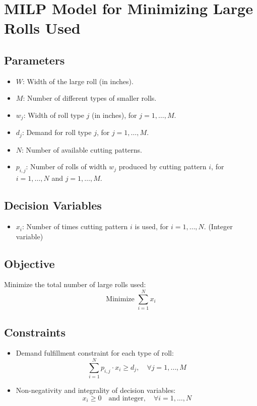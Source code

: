 \documentclass{article}
\begin{document}
\section*{MILP Model for Minimizing Large Rolls Used}

\subsection*{Parameters}
\begin{itemize}
    \item $W$: Width of the large roll (in inches).
    \item $M$: Number of different types of smaller rolls.
    \item $w_j$: Width of roll type $j$ (in inches), for $j = 1, \ldots, M$.
    \item $d_j$: Demand for roll type $j$, for $j = 1, \ldots, M$.
    \item $N$: Number of available cutting patterns.
    \item $p_{i,j}$: Number of rolls of width $w_j$ produced by cutting pattern $i$, for $i = 1, \ldots, N$ and $j = 1, \ldots, M$.
\end{itemize}

\subsection*{Decision Variables}
\begin{itemize}
    \item $x_i$: Number of times cutting pattern $i$ is used, for $i = 1, \ldots, N$. (Integer variable)
\end{itemize}

\subsection*{Objective}
Minimize the total number of large rolls used:
\[
\text{Minimize } \sum_{i=1}^{N} x_i
\]

\subsection*{Constraints}
\begin{itemize}
    \item Demand fulfillment constraint for each type of roll:
    \[
    \sum_{i=1}^{N} p_{i,j} \cdot x_i \geq d_j, \quad \forall j = 1, \ldots, M
    \]
    \item Non-negativity and integrality of decision variables:
    \[
    x_i \geq 0 \quad \text{and integer}, \quad \forall i = 1, \ldots, N
    \]
\end{itemize}
\end{document}
